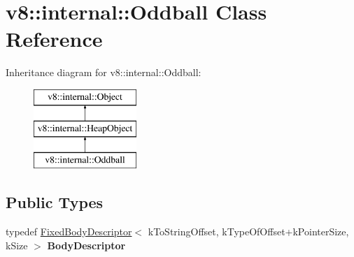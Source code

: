 \hypertarget{classv8_1_1internal_1_1_oddball}{}\section{v8\+:\+:internal\+:\+:Oddball Class Reference}
\label{classv8_1_1internal_1_1_oddball}
Inheritance diagram for v8\+:\+:internal\+:\+:Oddball\+:\begin{figure}[H]
\begin{center}
\leavevmode
\includegraphics[height=3.000000cm]{classv8_1_1internal_1_1_oddball}
\end{center}
\end{figure}
\subsection*{Public Types}
\begin{DoxyCompactItemize}
\item 
typedef \hyperlink{classv8_1_1internal_1_1_fixed_body_descriptor}{Fixed\+Body\+Descriptor}$<$ k\+To\+String\+Offset, k\+Type\+Of\+Offset+k\+Pointer\+Size, k\+Size $>$ {\bfseries Body\+Descriptor}\hypertarget{classv8_1_1internal_1_1_oddball_a45d95a2cd4e1df3c4e74b41286dd61b8}{}\label{classv8_1_1internal_1_1_oddball_a45d95a2cd4e1df3c4e74b41286dd61b8}

\end{DoxyCompactItemize}

